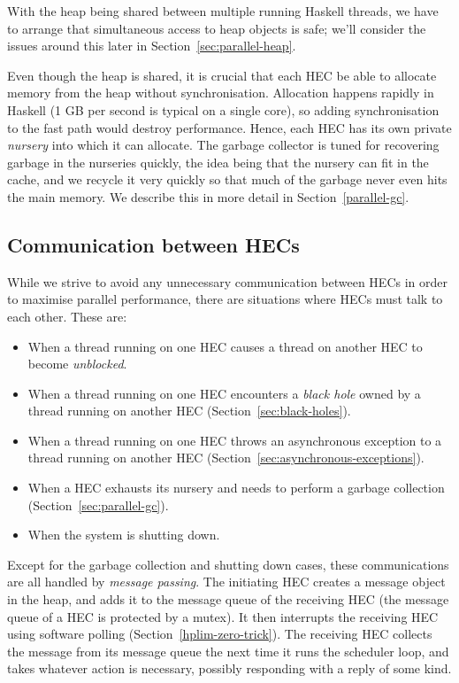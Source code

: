 With the heap being shared between multiple running Haskell threads,
we have to arrange that simultaneous access to heap objects is safe;
we'll consider the issues around this later in
Section~\ref{sec:parallel-heap}.

Even though the heap is shared, it is crucial that each HEC be able to
allocate memory from the heap without synchronisation.  Allocation
happens rapidly in Haskell (1 GB per second is typical on a single
core), so adding synchronisation to the fast path would destroy
performance.  Hence, each HEC has its own private \emph{nursery} into
which it can allocate. The garbage collector is tuned for recovering
garbage in the nurseries quickly, the idea being that the nursery can
fit in the cache, and we recycle it very quickly so that much of the
garbage never even hits the main memory.  We describe this in more
detail in Section~\ref{parallel-gc}.

\subsection{Communication between HECs}

While we strive to avoid any unnecessary communication between HECs in
order to maximise parallel performance, there are situations where
HECs must talk to each other.  These are:

\begin{itemize}
\item When a thread running on one HEC causes a thread on another HEC
  to become \emph{unblocked}.
\item When a thread running on one HEC encounters a \emph{black hole}
  owned by a thread running on another HEC
  (Section~\ref{sec:black-holes}).
\item When a thread running on one HEC throws an asynchronous
  exception to a thread running on another HEC
  (Section~\ref{sec:asynchronous-exceptions}).
\item When a HEC exhausts its nursery and needs to perform a garbage
  collection (Section~\ref{sec:parallel-gc}).
\item When the system is shutting down.
\end{itemize}

Except for the garbage collection and shutting down cases, these
communications are all handled by \emph{message passing}.  The
initiating HEC creates a message object in the heap, and adds it to
the message queue of the receiving HEC (the message queue of a HEC is
protected by a mutex).  It then interrupts the receiving HEC using
software polling (Section~\ref{hplim-zero-trick}).  The receiving HEC
collects the message from its message queue the next time it runs the
scheduler loop, and takes whatever action is necessary, possibly
responding with a reply of some kind.


